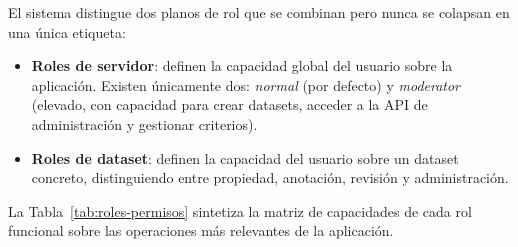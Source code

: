 El sistema distingue dos planos de rol que se combinan pero nunca se colapsan
en una única etiqueta:

\begin{itemize}
	\item \textbf{Roles de servidor}: definen la capacidad global del usuario sobre la
	      aplicación. Existen únicamente dos: \textit{normal} (por defecto) y
	      \textit{moderator} (elevado, con capacidad para crear datasets, acceder a la
	      API de administración y gestionar criterios).
	\item \textbf{Roles de dataset}: definen la capacidad del usuario sobre un dataset
	      concreto, distinguiendo entre propiedad, anotación, revisión y administración.
\end{itemize}

La Tabla~\ref{tab:roles-permisos} sintetiza la matriz de capacidades de cada
rol funcional sobre las operaciones más relevantes de la aplicación.

